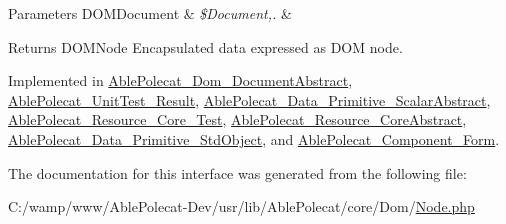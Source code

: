 \begin{DoxyParams}[1]{Parameters}
D\+O\+M\+Document & {\em \$\+Document,.} & \\
\hline
\end{DoxyParams}
\begin{DoxyReturn}{Returns}
D\+O\+M\+Node Encapsulated data expressed as D\+O\+M node. 
\end{DoxyReturn}


Implemented in \hyperlink{class_able_polecat___dom___document_abstract_a3241c66cb1cbb7b720be191808876012}{Able\+Polecat\+\_\+\+Dom\+\_\+\+Document\+Abstract}, \hyperlink{class_able_polecat___unit_test___result_a3241c66cb1cbb7b720be191808876012}{Able\+Polecat\+\_\+\+Unit\+Test\+\_\+\+Result}, \hyperlink{class_able_polecat___data___primitive___scalar_abstract_a3241c66cb1cbb7b720be191808876012}{Able\+Polecat\+\_\+\+Data\+\_\+\+Primitive\+\_\+\+Scalar\+Abstract}, \hyperlink{class_able_polecat___resource___core___test_a3241c66cb1cbb7b720be191808876012}{Able\+Polecat\+\_\+\+Resource\+\_\+\+Core\+\_\+\+Test}, \hyperlink{class_able_polecat___resource___core_abstract_a3241c66cb1cbb7b720be191808876012}{Able\+Polecat\+\_\+\+Resource\+\_\+\+Core\+Abstract}, \hyperlink{class_able_polecat___data___primitive___std_object_a3241c66cb1cbb7b720be191808876012}{Able\+Polecat\+\_\+\+Data\+\_\+\+Primitive\+\_\+\+Std\+Object}, and \hyperlink{class_able_polecat___component___form_a3241c66cb1cbb7b720be191808876012}{Able\+Polecat\+\_\+\+Component\+\_\+\+Form}.



The documentation for this interface was generated from the following file\+:\begin{DoxyCompactItemize}
\item 
C\+:/wamp/www/\+Able\+Polecat-\/\+Dev/usr/lib/\+Able\+Polecat/core/\+Dom/\hyperlink{_node_8php}{Node.\+php}\end{DoxyCompactItemize}
